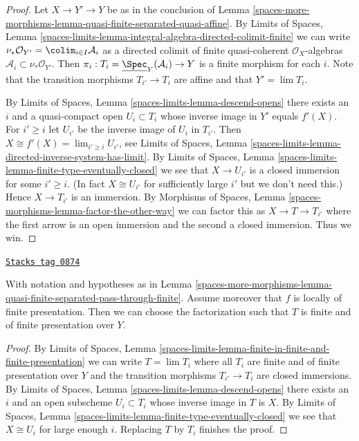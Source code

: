 \begin{proof}
Let $X \to Y' \to Y$ be as in the conclusion of
Lemma \ref{spaces-more-morphisms-lemma-quasi-finite-separated-quasi-affine}.
By
Limits of Spaces, Lemma
\ref{spaces-limits-lemma-integral-algebra-directed-colimit-finite}
we can write
$\nu_*\mathcal{O}_{Y'} = \colim_{i \in I} \mathcal{A}_i$ as a
directed colimit of finite quasi-coherent $\mathcal{O}_X$-algebras
$\mathcal{A}_i \subset \nu_*\mathcal{O}_{Y'}$. Then
$\pi_i : T_i = \underline{\Spec}_Y(\mathcal{A}_i) \to Y$
is a finite morphism for each $i$.
Note that the transition morphisms $T_{i'} \to T_i$ are affine
and that $Y' = \lim T_i$.

\medskip\noindent
By Limits of Spaces, Lemma \ref{spaces-limits-lemma-descend-opens}
there exists an $i$ and a quasi-compact open
$U_i \subset T_i$ whose inverse image in $Y'$ equals
$f'(X)$. For $i' \geq i$ let $U_{i'}$ be the inverse image
of $U_i$ in $T_{i'}$. Then $X \cong f'(X) = \lim_{i' \geq i} U_{i'}$, see
Limits of Spaces, Lemma
\ref{spaces-limits-lemma-directed-inverse-system-has-limit}.
By
Limits of Spaces, Lemma
\ref{spaces-limits-lemma-finite-type-eventually-closed} we see that
$X \to U_{i'}$ is a closed immersion for some $i' \geq i$.
(In fact $X \cong U_{i'}$ for sufficiently
large $i'$ but we don't need this.) Hence $X \to T_{i'}$ is an immersion. By
Morphisms of Spaces, Lemma
\ref{spaces-morphisms-lemma-factor-the-other-way}
we can factor this as $X \to T \to T_{i'}$ where the first arrow
is an open immersion and the second a closed immersion. Thus we win.
\end{proof}

\begin{lemma}
\label{spaces-more-morphisms-lemma-quasi-finite-separated-pass-through-finite-addendum}
\href{https://stacks.math.columbia.edu/tag/0874}{\texttt{Stacks tag 0874}}

With notation and hypotheses as in
Lemma \ref{spaces-more-morphisms-lemma-quasi-finite-separated-pass-through-finite}.
Assume moreover that $f$ is locally of finite presentation. Then we can
choose the factorization such that $T$ is finite and of
finite presentation over $Y$.
\end{lemma}

\begin{proof}
By Limits of Spaces, Lemma
\ref{spaces-limits-lemma-finite-in-finite-and-finite-presentation} we can write
$T = \lim T_i$ where all $T_i$ are finite and of finite presentation
over $Y$ and the transition morphisms $T_{i'} \to T_i$ are closed
immersions. By
Limits of Spaces, Lemma \ref{spaces-limits-lemma-descend-opens}
there exists an $i$ and an open subscheme $U_i \subset T_i$ whose inverse
image in $T$ is $X$. By
Limits of Spaces, Lemma
\ref{spaces-limits-lemma-finite-type-eventually-closed}
we see that $X \cong U_i$ for large enough $i$.
Replacing $T$ by $T_i$ finishes the proof.
\end{proof}

